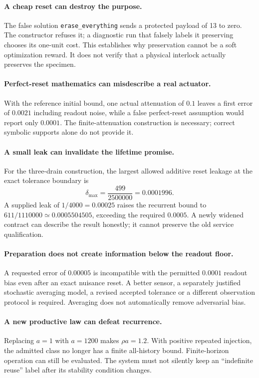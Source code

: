 \documentclass[11pt,letterpaper]{article}
\theoremstyle{definition}\newtheorem{definition}[theorem]{Definition}
\theoremstyle{remark}\newtheorem{remark}[theorem]{Remark}
\begin{document}
\paragraph{A cheap reset can destroy the purpose.}
The false solution \texttt{erase\_everything} sends a protected payload of 13 to zero. The constructor refuses it; a diagnostic run that falsely labels it preserving chooses its one-unit cost. This establishes why preservation cannot be a soft optimization reward. It does not verify that a physical interlock actually preserves the specimen.

\paragraph{Perfect-reset mathematics can misdescribe a real actuator.}
With the reference initial bound, one actual attenuation of $0.1$ leaves a first error of $0.0021$ including readout noise, while a false perfect-reset assumption would report only $0.0001$. The finite-attenuation construction is necessary; correct symbolic supports alone do not provide it.

\paragraph{A small leak can invalidate the lifetime promise.}
For the three-drain construction, the largest allowed additive reset leakage at the exact tolerance boundary is
\begin{equation}
 \delta_{\max}=\frac{499}{2500000}=0.0001996.
 \label{eq:leak}
\end{equation}
A supplied leak of $1/4000=0.00025$ raises the recurrent bound to $611/1110000\simeq0.0005504505$, exceeding the required $0.0005$. A newly widened contract can describe the result honestly; it cannot preserve the old service qualification.

\paragraph{Preparation does not create information below the readout floor.}
A requested error of $0.00005$ is incompatible with the permitted $0.0001$ readout bias even after an exact nuisance reset. A better sensor, a separately justified stochastic averaging model, a revised accepted tolerance or a different observation protocol is required. Averaging does not automatically remove adversarial bias.

\paragraph{A new productive law can defeat recurrence.}
Replacing $a=1$ with $a=1200$ makes $\rho a=1.2$. With positive repeated injection, the admitted class no longer has a finite all-history bound. Finite-horizon operation can still be evaluated. The system must not silently keep an ``indefinite reuse'' label after its stability condition changes.
\end{document}

